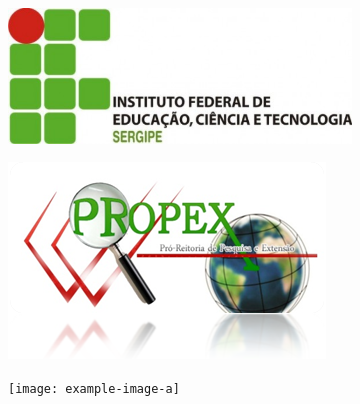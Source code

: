 \begin{figure}
    \centering 
    \begin{subfigure}{0.33\textwidth}
        \centering
        \includegraphics[scale=.5]{figuras/LogoIFS.jpg}
    \end{subfigure}\hfil
    \begin{subfigure}{0.33\textwidth}
        \centering
        \includegraphics[scale=1]{figuras/propex.png}
    \end{subfigure}
    \begin{subfigure}{0.33\textwidth}
        \centering
        \texttt{[image: example-image-a]}
    \end{subfigure}
\end{figure}